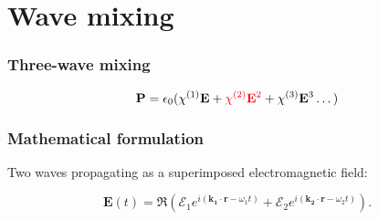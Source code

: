 \section{Wave mixing} 

\begin{frame}
  \frametitle{Three-wave mixing}
  \[
  \mathbf P = \epsilon_0 ( \chi^{\textup{(1)}} \mathbf E +
  \textcolor{red}{\chi^{\textup{(2)}} \mathbf E^2} + \chi^{\textup{(3)}} \mathbf E^3 \dots )
  \]

\end{frame}

\begin{frame}
  \frametitle{Mathematical formulation}

Two waves propagating as a superimposed electromagnetic field: 

    \[
    \mathbf{\mathbf{E}}(t) = \Re\left(\mathcal{E}_1e^{i(\mathbf{k_1} \cdot \mathbf{r} - \omega_1 t)}+\mathcal{E}_2e^{i(\mathbf{k_2} \cdot \mathbf{r} - \omega_2 t)} \right).
    \]



\end{frame}

